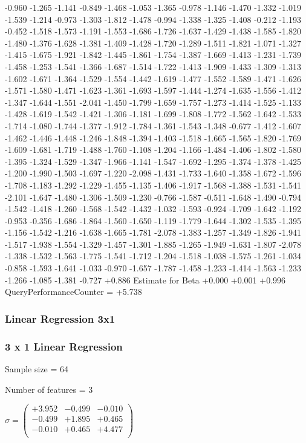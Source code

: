 \documentclass[9pt]{article}
\theoremstyle{plain}
\theoremstyle{definition}
\theoremstyle{remark}
\numberwithin{equation}{section}
\begin{document}
-0.960
-1.265
-1.141
-0.849
-1.468
-1.053
-1.365
-0.978
-1.146
-1.470
-1.332
-1.019
-1.539
-1.214
-0.973
-1.303
-1.812
-1.478
-0.994
-1.338
-1.325
-1.408
-0.212
-1.193
-0.452
-1.518
-1.573
-1.191
-1.553
-1.686
-1.726
-1.637
-1.429
-1.438
-1.585
-1.820
-1.480
-1.376
-1.628
-1.381
-1.409
-1.428
-1.720
-1.289
-1.511
-1.821
-1.071
-1.327
-1.415
-1.675
-1.921
-1.842
-1.445
-1.861
-1.754
-1.387
-1.669
-1.413
-1.231
-1.739
-1.458
-1.253
-1.541
-1.366
-1.687
-1.514
-1.722
-1.413
-1.909
-1.433
-1.309
-1.313
-1.602
-1.671
-1.364
-1.529
-1.554
-1.442
-1.619
-1.477
-1.552
-1.589
-1.471
-1.626
-1.571
-1.580
-1.471
-1.623
-1.361
-1.693
-1.597
-1.444
-1.274
-1.635
-1.556
-1.412
-1.347
-1.644
-1.551
-2.041
-1.450
-1.799
-1.659
-1.757
-1.273
-1.414
-1.525
-1.133
-1.428
-1.619
-1.542
-1.421
-1.306
-1.181
-1.699
-1.808
-1.772
-1.562
-1.642
-1.533
-1.714
-1.080
-1.744
-1.377
-1.912
-1.784
-1.361
-1.543
-1.348
-0.677
-1.412
-1.607
-1.462
-1.446
-1.448
-1.246
-1.848
-1.394
-1.403
-1.518
-1.665
-1.565
-1.820
-1.769
-1.609
-1.681
-1.719
-1.488
-1.760
-1.108
-1.204
-1.166
-1.484
-1.406
-1.802
-1.580
-1.395
-1.324
-1.529
-1.347
-1.966
-1.141
-1.547
-1.692
-1.295
-1.374
-1.378
-1.425
-1.200
-1.990
-1.503
-1.697
-1.220
-2.098
-1.431
-1.733
-1.640
-1.358
-1.672
-1.596
-1.708
-1.183
-1.292
-1.229
-1.455
-1.135
-1.406
-1.917
-1.568
-1.388
-1.531
-1.541
-2.101
-1.647
-1.480
-1.306
-1.509
-1.230
-0.766
-1.587
-0.511
-1.648
-1.490
-0.794
-1.542
-1.418
-1.260
-1.568
-1.542
-1.432
-1.032
-1.593
-0.924
-1.709
-1.642
-1.192
-0.953
-0.356
-1.686
-1.864
-1.560
-1.650
-1.119
-1.779
-1.644
-1.302
-1.535
-1.395
-1.156
-1.542
-1.216
-1.638
-1.665
-1.781
-2.078
-1.383
-1.257
-1.349
-1.826
-1.941
-1.517
-1.938
-1.554
-1.329
-1.457
-1.301
-1.885
-1.265
-1.949
-1.631
-1.807
-2.078
-1.338
-1.532
-1.563
-1.775
-1.541
-1.712
-1.204
-1.518
-1.038
-1.575
-1.261
-1.034
-0.858
-1.593
-1.641
-1.033
-0.970
-1.657
-1.787
-1.458
-1.233
-1.414
-1.563
-1.233
-1.266
-1.085
-1.381
-0.727
+0.886
Estimate for Beta
+0.000
+0.001
+0.996
QueryPerformanceCounter  =  +5.738
\subsubsection{Linear Regression 3x1}
\subsubsection{3 x 1 Linear Regression}
Sample size = 64

Number of features = 3

$\sigma = \left(
\begin{array}{
ccc}
+3.952 & -0.499 & -0.010 \\
-0.499 & +1.895 & +0.465 \\
-0.010 & +0.465 & +4.477 \\
\end{array}
\right)$ \newline 
\end{document}
